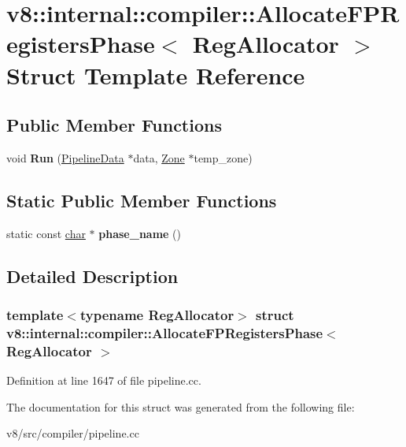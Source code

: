 \hypertarget{structv8_1_1internal_1_1compiler_1_1AllocateFPRegistersPhase}{}\section{v8\+:\+:internal\+:\+:compiler\+:\+:Allocate\+F\+P\+Registers\+Phase$<$ Reg\+Allocator $>$ Struct Template Reference}
\label{structv8_1_1internal_1_1compiler_1_1AllocateFPRegistersPhase}
\subsection*{Public Member Functions}
\begin{DoxyCompactItemize}
\item 
\mbox{\label{structv8_1_1internal_1_1compiler_1_1AllocateFPRegistersPhase_a4c6dd764c8c48b49f8ecd1e1035f5079}} 
void {\bfseries Run} (\mbox{\hyperlink{classv8_1_1internal_1_1compiler_1_1PipelineData}{Pipeline\+Data}} $\ast$data, \mbox{\hyperlink{classv8_1_1internal_1_1Zone}{Zone}} $\ast$temp\+\_\+zone)
\end{DoxyCompactItemize}
\subsection*{Static Public Member Functions}
\begin{DoxyCompactItemize}
\item 
\mbox{\label{structv8_1_1internal_1_1compiler_1_1AllocateFPRegistersPhase_a29ced843c54c50d3169abe3aaa193858}} 
static const \mbox{\hyperlink{classchar}{char}} $\ast$ {\bfseries phase\+\_\+name} ()
\end{DoxyCompactItemize}


\subsection{Detailed Description}
\subsubsection*{template$<$typename Reg\+Allocator$>$\newline
struct v8\+::internal\+::compiler\+::\+Allocate\+F\+P\+Registers\+Phase$<$ Reg\+Allocator $>$}



Definition at line 1647 of file pipeline.\+cc.



The documentation for this struct was generated from the following file\+:\begin{DoxyCompactItemize}
\item 
v8/src/compiler/pipeline.\+cc\end{DoxyCompactItemize}
